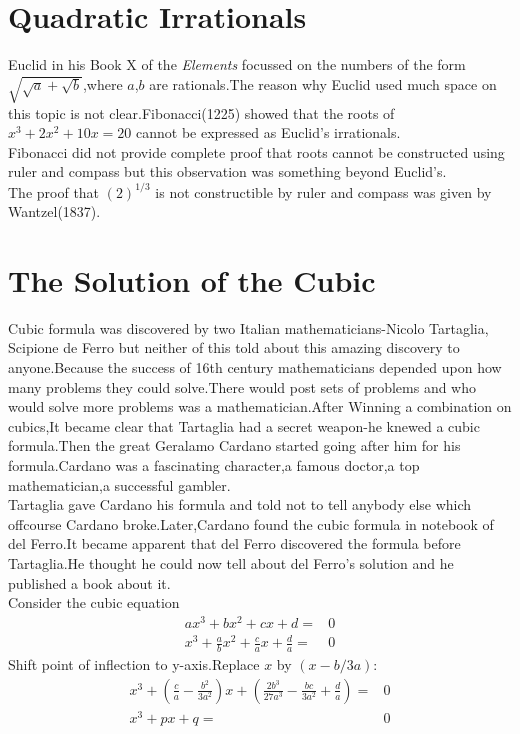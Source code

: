 \documentclass[a4paper,reqno,11pt]{book}
\theoremstyle{plain}%
\theoremstyle{definition}
\begin{document}
\section{Quadratic Irrationals}
Euclid in his Book X of the \textit{Elements} focussed on the numbers of the form $\sqrt{\sqrt{a}+\sqrt{b}}$,where $a$,$b$ are rationals.The reason why Euclid used much space on this topic is not clear.Fibonacci(1225) showed that the roots of $x^3+2x^2+10x=20$ cannot be expressed as Euclid's irrationals.\\
Fibonacci did not provide complete proof that roots cannot be constructed using ruler and compass but this observation was something beyond Euclid's.\\
The proof that $(2)^{1/3}$ is not constructible by ruler and compass was given by Wantzel(1837).
\section{The Solution of the Cubic}
Cubic formula was discovered by two Italian mathematicians-Nicolo Tartaglia, Scipione de Ferro but neither of this told about this amazing discovery to anyone.Because the success of 16th century mathematicians depended upon how many problems they could solve.There would post sets of problems and who would solve more problems was a mathematician.After Winning a combination on cubics,It became clear that Tartaglia had a secret weapon-he knewed a cubic formula.Then the great Geralamo Cardano started going after him for his formula.Cardano was a fascinating character,a famous doctor,a top mathematician,a successful gambler.\\
Tartaglia gave Cardano his formula and told not to tell anybody else which offcourse Cardano broke.Later,Cardano found the cubic formula in notebook of del Ferro.It became apparent that del Ferro discovered the formula before Tartaglia.He thought he could now tell about del Ferro's solution and he published a book about it.\cite{ref 5}\\
Consider the cubic equation 
\begin{align*}
    ax^3+bx^2+cx+d=&0\\
    x^3+\frac{a}{b}x^2+\frac{c}{a}x+\frac{d}{a}=&0
\end{align*}
Shift point of inflection to y-axis.Replace $x$ by $(x-b/3a)$:
\begin{eqnarray*}
    x^3+\left(\frac{c}{a}-\frac{b^2}{3a^2}\right)x+\left(\frac{2b^3}{27a^3}-\frac{bc}{3a^2}+\frac{d}{a}\right)=&0\\
    x^3+px+q=&0
\end{eqnarray*}
\end{document}
